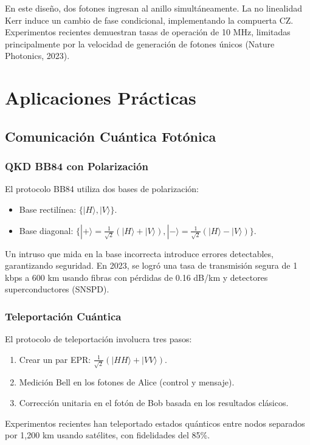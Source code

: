 \documentclass{article}
\begin{document}
En este diseño, dos fotones ingresan al anillo simultáneamente. La no linealidad Kerr induce un cambio de fase condicional, implementando la compuerta CZ. Experimentos recientes demuestran tasas de operación de 10 MHz, limitadas principalmente por la velocidad de generación de fotones únicos (Nature Photonics, 2023).

\section{Aplicaciones Prácticas}

\subsection*{Comunicación Cuántica Fotónica}

\subsubsection*{QKD BB84 con Polarización}

El protocolo BB84 utiliza dos bases de polarización:
\begin{itemize}
    \item Base rectilínea: $\{|H\rangle, |V\rangle\}$.
    \item Base diagonal: $\{|+\rangle = \frac{1}{\sqrt{2}}(|H\rangle + |V\rangle), |-\rangle = \frac{1}{\sqrt{2}}(|H\rangle - |V\rangle)\}$.
\end{itemize}
Un intruso que mida en la base incorrecta introduce errores detectables, garantizando seguridad. En 2023, se logró una tasa de transmisión segura de 1 kbps a 600 km usando fibras con pérdidas de 0.16 dB/km y detectores superconductores (SNSPD).

\subsubsection*{Teleportación Cuántica}

El protocolo de teleportación involucra tres pasos:
\begin{enumerate}
    \item Crear un par EPR: $\frac{1}{\sqrt{2}}(|HH\rangle + |VV\rangle)$.
    \item Medición Bell en los fotones de Alice (control y mensaje).
    \item Corrección unitaria en el fotón de Bob basada en los resultados clásicos.
\end{enumerate}
Experimentos recientes han teleportado estados quánticos entre nodos separados por 1,200 km usando satélites, con fidelidades del 85\%.
\end{document}
